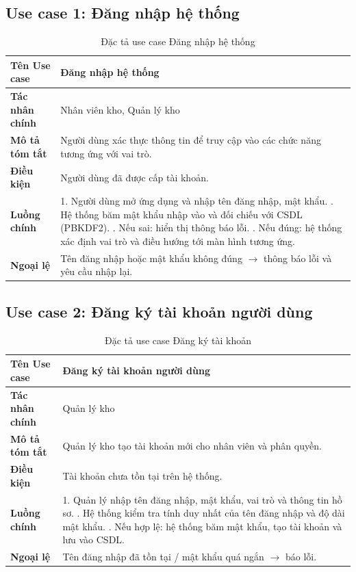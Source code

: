\documentclass[12pt,a4paper]{report}
\begin{document}
\subsection{Use case 1: Đăng nhập hệ thống}
\begin{table}[H]
\centering
\renewcommand{\arraystretch}{1.3}
\begin{tabularx}{\textwidth}{|L{3.2cm}|X|}
\hline
\textbf{Tên Use case} & Đăng nhập hệ thống \\ \hline
\textbf{Tác nhân chính} & Nhân viên kho, Quản lý kho \\ \hline
\textbf{Mô tả tóm tắt} & Người dùng xác thực thông tin để truy cập vào các chức năng tương ứng với vai trò. \\ \hline
\textbf{Điều kiện} & Người dùng đã được cấp tài khoản. \\ \hline
\textbf{Luồng chính} &
1. Người dùng mở ứng dụng và nhập tên đăng nhập, mật khẩu. . Hệ thống băm mật khẩu nhập vào và đối chiếu với CSDL (PBKDF2). . Nếu sai: hiển thị thông báo lỗi. . Nếu đúng: hệ thống xác định vai trò và điều hướng tới màn hình tương ứng. \\ \hline
\textbf{Ngoại lệ} & Tên đăng nhập hoặc mật khẩu không đúng $\rightarrow$ thông báo lỗi và yêu cầu nhập lại. \\ \hline
\end{tabularx}
\caption{Đặc tả use case Đăng nhập hệ thống}
\end{table}

\subsection{Use case 2: Đăng ký tài khoản người dùng}
\begin{table}[H]
\centering
\renewcommand{\arraystretch}{1.3}
\begin{tabularx}{\textwidth}{|L{3.2cm}|X|}
\hline
\textbf{Tên Use case} & Đăng ký tài khoản người dùng \\ \hline
\textbf{Tác nhân chính} & Quản lý kho \\ \hline
\textbf{Mô tả tóm tắt} & Quản lý kho tạo tài khoản mới cho nhân viên và phân quyền. \\ \hline
\textbf{Điều kiện} & Tài khoản chưa tồn tại trên hệ thống. \\ \hline
\textbf{Luồng chính} &
1. Quản lý nhập tên đăng nhập, mật khẩu, vai trò và thông tin hồ sơ. . Hệ thống kiểm tra tính duy nhất của tên đăng nhập và độ dài mật khẩu. . Nếu hợp lệ: hệ thống băm mật khẩu, tạo tài khoản và lưu vào CSDL. \\ \hline
\textbf{Ngoại lệ} & Tên đăng nhập đã tồn tại / mật khẩu quá ngắn $\rightarrow$ báo lỗi. \\ \hline
\end{tabularx}
\caption{Đặc tả use case Đăng ký tài khoản}
\end{table}
\end{document}

